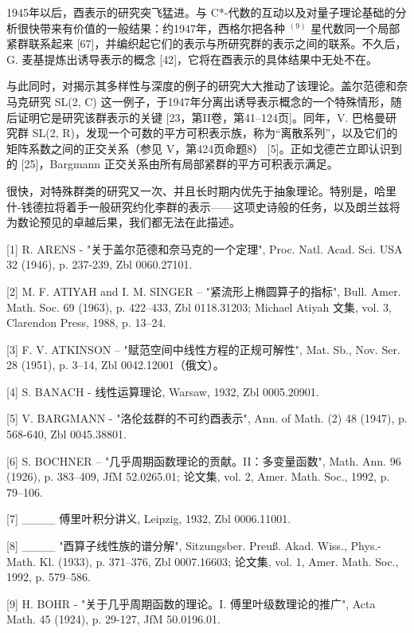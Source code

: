 1945年以后，酉表示的研究突飞猛进。与 C*-代数的互动以及对量子理论基础的分析很快带来有价值的一般结果：约1947年，西格尔把各种 \(^{(9)}\) 星代数同一个局部紧群联系起来 {[}67{]}，并编织起它们的表示与所研究群的表示之间的联系。不久后，G. 麦基提炼出诱导表示的概念 {[}42{]}，它将在酉表示的具体结果中无处不在。

与此同时，对揭示其多样性与深度的例子的研究大大推动了该理论。盖尔范德和奈马克研究 SL(2, C) 这一例子，于1947年分离出诱导表示概念的一个特殊情形，随后证明它是研究该群表示的关键 {[}23，第II卷，第41--124页{]}。同年，V. 巴格曼研究群 SL(2, R)，发现一个可数的平方可积表示族，称为“离散系列”，以及它们的矩阵系数之间的正交关系（参见 V，第424页命题8） {[}5{]}。正如戈德芒立即认识到的 {[}25{]}，Bargmann 正交关系由所有局部紧群的平方可积表示满足。

很快，对特殊群类的研究又一次、并且长时期内优先于抽象理论。特别是，哈里什-钱德拉将着手一般研究约化李群的表示——这项史诗般的任务，以及朗兰兹将为数论预见的卓越后果，我们都无法在此描述。


{[}1{]} R. ARENS - "关于盖尔范德和奈马克的一个定理", Proc. Natl. Acad. Sci. USA 32 (1946), p. 237-239, Zbl 0060.27101.

{[}2{]} M. F. ATIYAH and I. M. SINGER -- "紧流形上椭圆算子的指标", Bull. Amer. Math. Soc. 69 (1963), p. 422--433, Zbl 0118.31203; Michael Atiyah 文集, vol. 3, Clarendon Press, 1988, p. 13--24.

{[}3{]} F. V. ATKINSON -- "赋范空间中线性方程的正规可解性", Mat. Sb., Nov. Ser. 28 (1951), p. 3--14, Zbl 0042.12001（俄文）。

{[}4{]} S. BANACH - 线性运算理论, Warsaw, 1932, Zbl 0005.20901.

{[}5{]} V. BARGMANN - "洛伦兹群的不可约酉表示", Ann. of Math. (2) 48 (1947), p. 568-640, Zbl 0045.38801.

{[}6{]} S. BOCHNER -- "几乎周期函数理论的贡献。II：多变量函数", Math. Ann. 96 (1926), p. 383--409, JfM 52.0265.01; 论文集, vol. 2, Amer. Math. Soc., 1992, p. 79--106.

{[}7{]} \_\_\_\_ 傅里叶积分讲义, Leipzig, 1932, Zbl 0006.11001.

{[}8{]} \_\_\_\_ "酉算子线性族的谱分解", Sitzungsber. Preuß. Akad. Wiss., Phys.-Math. Kl. (1933), p. 371--376, Zbl 0007.16603; 论文集, vol. 1, Amer. Math. Soc., 1992, p. 579--586.

{[}9{]} H. BOHR - "关于几乎周期函数的理论。I. 傅里叶级数理论的推广", Acta Math. 45 (1924), p. 29-127, JfM 50.0196.01.


